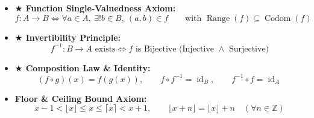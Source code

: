 \documentclass[11pt,a4paper]{article}
\begin{document}
\begin{defbox}
\begin{itemize}
    \[
    \forall a \in A, \, (a, a) \in R \iff \text{All diagonal entries } m_{ii} = 1 \iff \text{Self-loops on all digraph vertices}
    \]
    \item \textbf{\color{gold!90!black}$\bigstar$ Function Single-Valuedness Axiom:}
    \[
    f: A \to B \iff \forall a \in A, \ \exists! b \in B, \ (a, b) \in f \qquad \text{with } \operatorname{Range}(f) \subseteq \operatorname{Codom}(f)
    \]
    \item \textbf{\color{gold!90!black}$\bigstar$ Invertibility Principle:}
    \[
    f^{-1}: B \to A \text{ exists} \iff f \text{ is Bijective (Injective } \land \text{ Surjective)}
    \]
    \item \textbf{\color{gold!90!black}$\bigstar$ Composition Law \& Identity:}
    \[
    (f \circ g)(x) = f(g(x)), \qquad f \circ f^{-1} = \operatorname{id}_B, \qquad f^{-1} \circ f = \operatorname{id}_A
    \]
    \item \textbf{Floor \& Ceiling Bound Axiom:}
    \[
    x - 1 < \lfloor x \rfloor \le x \le \lceil x \rceil < x + 1, \qquad \lfloor x + n \rfloor = \lfloor x \rfloor + n \quad (\forall n \in \mathbb{Z})
    \]
\end{itemize}
\end{defbox}

\newpage
\end{document}
